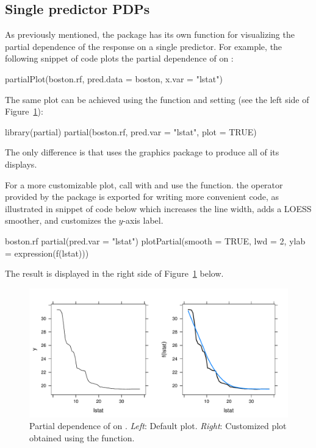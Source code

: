 \subsection{Single predictor PDPs}

As previously mentioned, the  package has its own  function for visualizing the partial dependence of the response on a single predictor. For example, the following snippet of code plots the partial dependence of  on :
\begin{example}
partialPlot(boston.rf, pred.data = boston, x.var = "lstat")
\end{example}
The same plot can be achieved using the  function and setting  (see the left side of Figure~\ref{fig:pd_lstat}):
\begin{example}
library(partial)
partial(boston.rf, pred.var = "lstat", plot = TRUE)
\end{example}
The only difference is that  uses the  graphics package to produce all of its displays.

For a more customizable plot, call  with  and use the  function.  the  operator \code{\%>\%} provided by the  package \citep{magrittr-pkg} is exported for writing more convenient code, as illustrated in snippet of code below which increases the line width, adds a LOESS smoother, and customizes the $y$-axis label.
\begin{example}
boston.rf %
  partial(pred.var = "lstat") %
  plotPartial(smooth = TRUE, lwd = 2, ylab = expression(f(lstat)))
\end{example}
The result is displayed in the right side of Figure~\ref{fig:pd_lstat} below.

\begin{figure}[htbp]
  \centering
  \includegraphics[width=1.0\linewidth]{pd_lstat}
  \caption{Partial dependence of  on . \textit{Left}: Default plot. \textit{Right}: Customized plot obtained using the  function.}
  \label{fig:pd_lstat}
\end{figure}


